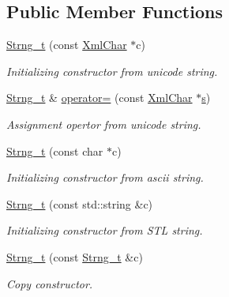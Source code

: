 \subsection*{Public Member Functions}
\begin{DoxyCompactItemize}
\item 
\hyperlink{class_d_d4hep_1_1_x_m_l_1_1_strng__t_a172f140c427ae76165669b5822588e6e}{Strng\_\-t} (const \hyperlink{namespace_d_d4hep_1_1_x_m_l_a09e5d9cc86ed782f6826dfe0778c1815}{XmlChar} $\ast$c)
\begin{DoxyCompactList}\small\item\em Initializing constructor from unicode string. \item\end{DoxyCompactList}\item 
\hyperlink{class_d_d4hep_1_1_x_m_l_1_1_strng__t}{Strng\_\-t} \& \hyperlink{class_d_d4hep_1_1_x_m_l_1_1_strng__t_a9d28b473f29f5cb66de040207fd38e54}{operator=} (const \hyperlink{namespace_d_d4hep_1_1_x_m_l_a09e5d9cc86ed782f6826dfe0778c1815}{XmlChar} $\ast$\hyperlink{_volumes_8cpp_a17ca6bfc8040d695d3cada22a4763d40}{s})
\begin{DoxyCompactList}\small\item\em Assignment opertor from unicode string. \item\end{DoxyCompactList}\item 
\hyperlink{class_d_d4hep_1_1_x_m_l_1_1_strng__t_ac846845ea068229d358849a6be38481e}{Strng\_\-t} (const char $\ast$c)
\begin{DoxyCompactList}\small\item\em Initializing constructor from ascii string. \item\end{DoxyCompactList}\item 
\hyperlink{class_d_d4hep_1_1_x_m_l_1_1_strng__t_a494da46642509d83375a96a6ce725ad4}{Strng\_\-t} (const std::string \&c)
\begin{DoxyCompactList}\small\item\em Initializing constructor from STL string. \item\end{DoxyCompactList}\item 
\hyperlink{class_d_d4hep_1_1_x_m_l_1_1_strng__t_a44f256b1244bd55f56668be6df3550c9}{Strng\_\-t} (const \hyperlink{class_d_d4hep_1_1_x_m_l_1_1_strng__t}{Strng\_\-t} \&c)
\begin{DoxyCompactList}\small\item\em Copy constructor. \item\end{DoxyCompactList}\item 

\end{DoxyCompactItemize}
